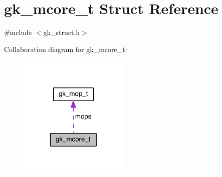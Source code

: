 \hypertarget{structgk__mcore__t}{}\section{gk\+\_\+mcore\+\_\+t Struct Reference}
\label{structgk__mcore__t}


{\ttfamily \#include $<$gk\+\_\+struct.\+h$>$}



Collaboration diagram for gk\+\_\+mcore\+\_\+t\+:\nopagebreak
\begin{figure}[H]
\begin{center}
\leavevmode
\includegraphics[width=148pt]{structgk__mcore__t__coll__graph}
\end{center}
\end{figure}
